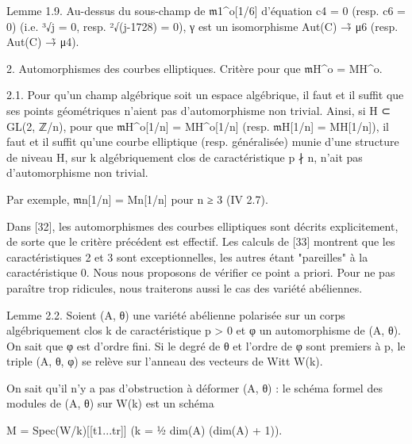 \documentclass[11pt,a4paper]{article}
\begin{document}
Lemme 1.9. Au-dessus du sous-champ de \ensuremath{\mathfrak{m}}\textunderscore{}1\textasciicircum{}o[1/6] d'équation c\textunderscore{}4 = 0 (resp. c\textunderscore{}6 = 0) (i.e. ³√j = 0, resp. ²√(j-1728) = 0), γ est un isomorphisme Aut(C) →̃ μ\textunderscore{}6 (resp. Aut(C) →̃ μ\textunderscore{}4).

2. Automorphismes des courbes elliptiques. Critère pour que \ensuremath{\mathfrak{m}}\textunderscore{}H\textasciicircum{}o = M\textunderscore{}H\textasciicircum{}o.

2.1. Pour qu'un champ algébrique soit un espace algébrique, il faut et il suffit que ses points géométriques n'aient pas d'automorphisme non trivial. Ainsi, si H ⊂ GL(2, ℤ/n), pour que \ensuremath{\mathfrak{m}}\textunderscore{}H\textasciicircum{}o[1/n] = M\textunderscore{}H\textasciicircum{}o[1/n] (resp. \ensuremath{\mathfrak{m}}\textunderscore{}H[1/n] = M\textunderscore{}H[1/n]), il faut et il suffit qu'une courbe elliptique (resp. généralisée) munie d'une structure de niveau H, sur k algébriquement clos de caractéristique p ∤ n, n'ait pas d'automorphisme non trivial.

Par exemple, \ensuremath{\mathfrak{m}}\textunderscore{}n[1/n] = M\textunderscore{}n[1/n] pour n ≥ 3 (IV 2.7).

Dans [32], les automorphismes des courbes elliptiques sont décrits explicitement, de sorte que le critère précédent est effectif. Les calculs de [33] montrent que les caractéristiques 2 et 3 sont exceptionnelles, les autres étant "pareilles" à la caractéristique 0. Nous nous proposons de vérifier ce point a priori. Pour ne pas paraître trop ridicules, nous traiterons aussi le cas des variété abéliennes.

Lemme 2.2. Soient (A, θ) une variété abélienne polarisée sur un corps algébriquement clos k de caractéristique p > 0 et φ un automorphisme de (A, θ). On sait que φ est d'ordre fini. Si le degré de θ et l'ordre de φ sont premiers à p, le triple (A, θ, φ) se relève sur l'anneau des vecteurs de Witt W(k).

On sait qu'il n'y a pas d'obstruction à déformer (A, θ) : le schéma formel des modules de (A, θ) sur W(k) est un schéma

M = Spec(W/k)[[t\textunderscore{}1...t\textunderscore{}r]]        (k = ½ dim(A) (dim(A) + 1)).
\end{document}
